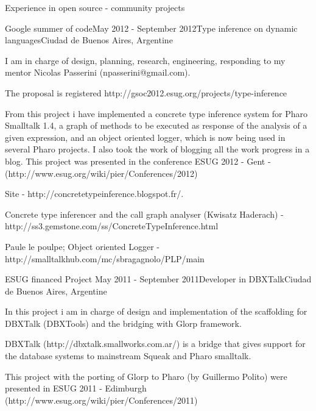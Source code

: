 \documentclass{resume} %
\begin{document}
\begin{rSection}{Experience in open source - community projects}
\begin{rSubsection}{Google summer of code}{May 2012 - September 2012}{Type inference on dynamic languages}{Ciudad de Buenos Aires, Argentine}
\item I am in charge of design, planning, research, engineering, responding to my mentor Nicolas Passerini (npasserini@gmail.com). 
\item The proposal is registered http://gsoc2012.esug.org/projects/type-inference 
\item From this project i have implemented a concrete type inference system for Pharo Smalltalk 1.4, a graph of methods to be executed as response of the analysis of a given expression,  and an object oriented logger, which is now being used in several Pharo projects. I also took the work of blogging all the work progress in a blog. This project was presented in the conference ESUG 2012 - Gent - (http://www.esug.org/wiki/pier/Conferences/2012) 
\item Site - http://concretetypeinference.blogspot.fr/. 
\item Concrete type inferencer and the call graph analyser (Kwisatz Haderach) - http://ss3.gemstone.com/ss/ConcreteTypeInference.html
\item Paule le poulpe; Object oriented Logger - http://smalltalkhub.com/mc/sbragagnolo/PLP/main
\end{rSubsection}

 
\begin{rSubsection}{ESUG financed Project}{ May 2011 - September 2011}{Developer in DBXTalk}{Ciudad de Buenos Aires, Argentine}
\item In this project i am in charge of design and implementation of the scaffolding for DBXTalk (DBXTools) and the bridging with Glorp framework.
\item DBXTalk (http://dbxtalk.smallworks.com.ar/) is a bridge that gives support for the  database systems to mainstream Squeak and Pharo smalltalk. 
\item This project with the porting of Glorp to Pharo (by Guillermo Polito) were presented in ESUG 2011 - Edimburgh (http://www.esug.org/wiki/pier/Conferences/2011)
\end{rSubsection}


\end{rSection}
\end{document}
